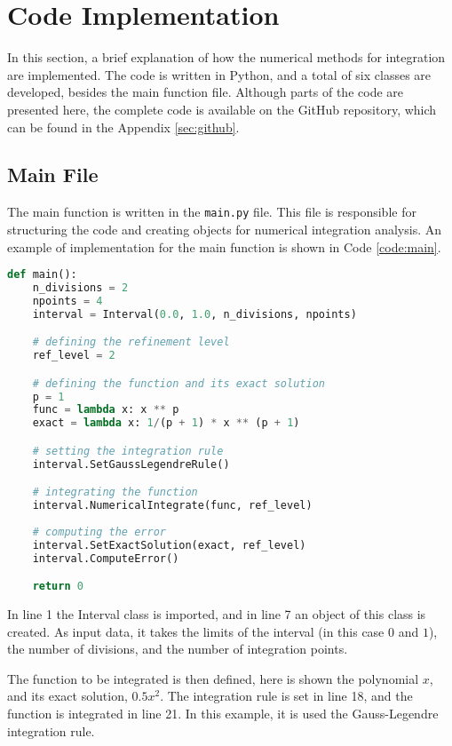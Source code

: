 \section{Code Implementation} \label{sec:code-implementation}
In this section, a brief explanation of how the numerical methods for integration are implemented. The code is written in Python, and a total of six classes are developed, besides the main function file. Although parts of the code are presented here, the complete code is available on the GitHub repository, which can be found in the Appendix \ref{sec:github}.

\subsection{Main File}
The main function is written in the \texttt{main.py} file. This file is responsible for structuring the code and creating objects for numerical integration analysis. An example of implementation for the main function is shown in Code \ref{code:main}.
\begin{lstlisting}[language=Python, caption={Main function.}, label={code:main}] 
def main():
    n_divisions = 2
    npoints = 4
    interval = Interval(0.0, 1.0, n_divisions, npoints)

    # defining the refinement level
    ref_level = 2

    # defining the function and its exact solution
    p = 1
    func = lambda x: x ** p
    exact = lambda x: 1/(p + 1) * x ** (p + 1)

    # setting the integration rule
    interval.SetGaussLegendreRule()

    # integrating the function
    interval.NumericalIntegrate(func, ref_level)
    
    # computing the error
    interval.SetExactSolution(exact, ref_level)
    interval.ComputeError()

    return 0
\end{lstlisting}

In line 1 the Interval class is imported, and in line 7 an object of this class is created. As input data, it takes the limits of the interval (in this case $0$ and $1$), the number of divisions, and the number of integration points. 

The function to be integrated is then defined, here is shown the polynomial $x$, and its exact solution, $0.5x^2$. The integration rule is set in line 18, and the function is integrated in line 21. In this example, it is used the Gauss-Legendre integration rule. 


